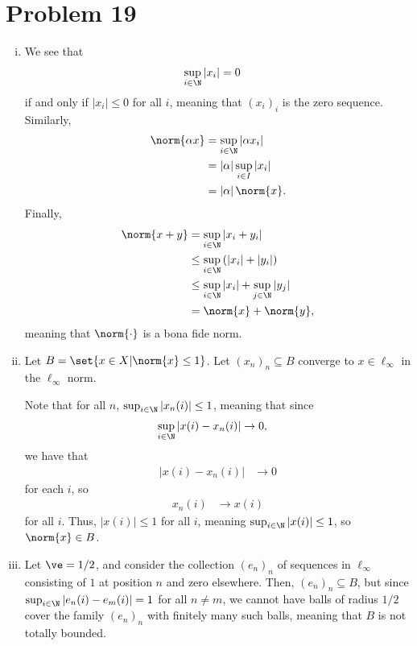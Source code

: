 \documentclass[10pt]{mypackage}
\begin{document}
\section{Problem 19}%
\begin{enumerate}[(i)]
  \item We see that
    \begin{align*}
      \sup_{i\in \N} \left\vert x_i \right\vert &= 0
    \end{align*}
    if and only if $\left\vert x_i \right\vert \leq 0$ for all $i$, meaning that $\left( x_i \right)_{i}$ is the zero sequence. Similarly,
    \begin{align*}
      \norm{\alpha x} &= \sup_{i\in \N} \left\vert \alpha x_i \right\vert\\
                      &= \left\vert \alpha \right\vert\sup_{i\in I}\left\vert x_i \right\vert\\
                      &= \left\vert \alpha \right\vert\norm{x}.
    \end{align*}
    Finally,
    \begin{align*}
      \norm{x + y} &= \sup_{i\in \N} \left\vert x_i + y_i \right\vert\\
                   &\leq \sup_{i\in \N} \left( \left\vert x_i \right\vert + \left\vert y_i \right\vert \right)\\
                   &\leq \sup_{i\in\N} \left\vert x_i \right\vert + \sup_{j\in\N} \left\vert y_j \right\vert\\
                   &= \norm{x} + \norm{y},
    \end{align*}
    meaning that $\norm{\cdot}$ is a bona fide norm.
  \item Let $B=  \set{x\in X | \norm{x} \leq 1}$. Let $\left( x_n \right)_{n}\subseteq B$ converge to $x\in \ell_{\infty}$ in the $\ell_{\infty}$ norm.\newline

    Note that for all $n$, $\sup_{i\in \N} \left\vert x_n(i) \right\vert \leq 1$, meaning that since
    \begin{align*}
      \sup_{i\in \N} \left\vert x(i) - x_n(i) \right\vert &\rightarrow 0,
    \end{align*}
    we have that
    \begin{align*}
      \left\vert x(i) - x_n(i) \right\vert &\rightarrow 0
    \end{align*}
    for each $i$, so
    \begin{align*}
      x_n(i) &\rightarrow x(i)
    \end{align*}
    for all $i$. Thus, $\left\vert x(i) \right\vert \leq 1$ for all $i$, meaning $\sup_{i\in \N}\left\vert x(i) \right\vert \leq 1$, so $\norm{x} \in B$.
  \item Let $\ve = 1/2$, and consider the collection $\left( e_n \right)_n$ of sequences in $\ell_{\infty}$ consisting of $1$ at position $n$ and zero elsewhere. Then, $\left( e_n \right)_n\subseteq B$, but since $\sup_{i\in \N}\left\vert e_n(i)-e_m(i) \right\vert = 1$ for all $n\neq m$, we cannot have balls of radius $1/2$ cover the family $\left( e_n \right)_n$ with finitely many such balls, meaning that $B$ is not totally bounded.
\end{enumerate}
\end{document}
